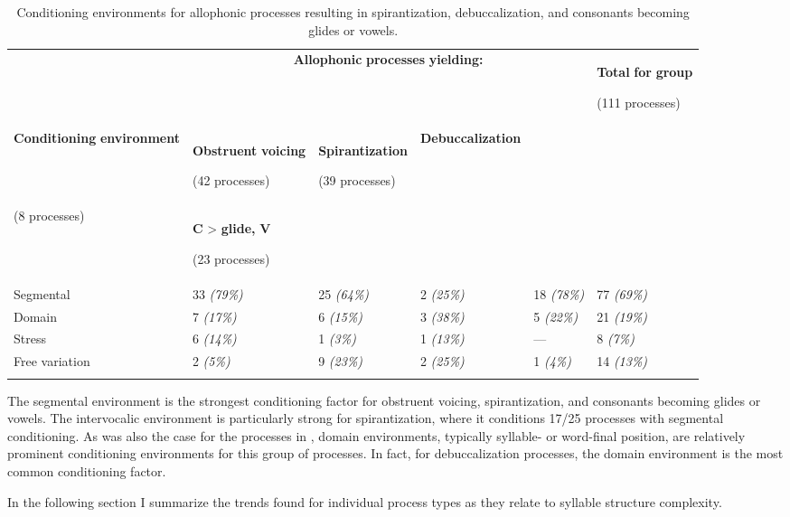 \begin{table}
\begin{tabularx}{\textwidth}{XXXXXX}
\lsptoprule
 & \multicolumn{4}{c}{ \textbf{Allophonic} \textbf{processes} \textbf{yielding:}} & { \textbf{Total} \textbf{for} \textbf{group}}

 (111 processes)\\
 \textbf{Conditioning} \textbf{environment} & { \textbf{Obstruent} \textbf{voicing}}

 (42 processes) & { \textbf{Spirantization}}

 (39 processes) & \textbf{Debuccalization}\\
(8 processes) & { \textbf{C} > \textbf{glide,} \textbf{V}}

 (23 processes) & \\
 Segmental & 33 \textit{(79\%)} & 25 \textit{(64\%)} & 2 \textit{(25\%)} & 18 \textit{(78\%)} & 77 \textit{(69\%)}\\
 Domain & 7 \textit{(17\%)} & 6 \textit{(15\%)} & 3 \textit{(38\%)} & 5 \textit{(22\%)} & 21 \textit{(19\%)}\\
 Stress & 6 \textit{(14\%)} & 1 \textit{(3\%)} & 1 \textit{(13\%)} & — & 8 \textit{(7\%)}\\
 Free variation & 2 \textit{(5\%)} & 9 \textit{(23\%)} & 2 \textit{(25\%)} & 1 \textit{(4\%)} & 14 \textit{(13\%)}\\
\lspbottomrule
\end{tabularx}
\caption{\label{7.6}Conditioning environments for allophonic processes resulting in spirantization, debuccalization, and consonants becoming glides or vowels.}
\end{table}




  The segmental environment is the strongest conditioning factor for obstruent voicing, spirantization, and consonants becoming glides or vowels. The intervocalic environment is particularly strong for spirantization, where it conditions 17/25 processes with segmental conditioning. As was also the case for the processes in , domain environments, typically syllable- or word-final position, are relatively prominent conditioning environments for this group of processes. In fact, for debuccalization processes, the domain environment is the most common conditioning factor.



  In the following section I summarize the trends found for individual process types as they relate to syllable structure complexity.


